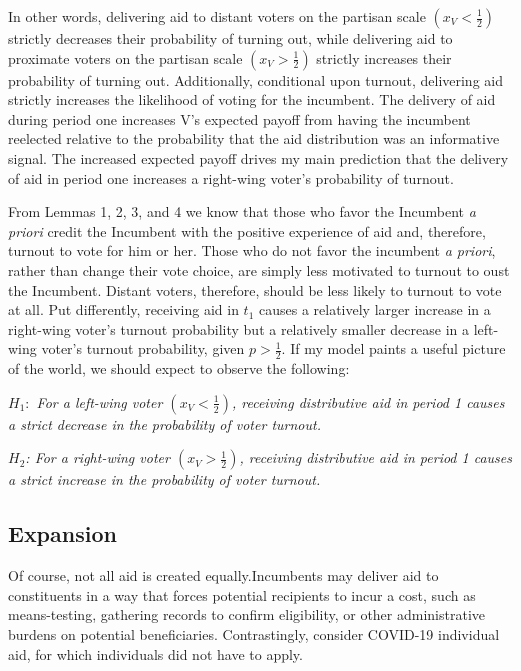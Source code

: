 \documentclass[12pt]{paper}
\begin{document}
In other words, delivering aid to distant voters on the partisan scale $(x_V < \frac{1}{2})$ strictly decreases their probability of turning out, while delivering aid to proximate voters on the partisan scale $(x_V > \frac{1}{2})$  strictly increases their probability of turning out. Additionally, conditional upon turnout, delivering aid strictly increases the likelihood of voting for the incumbent. The delivery of aid during period one increases V’s expected payoff from having the incumbent reelected relative to the probability that the aid distribution was an informative signal. The increased expected payoff drives my main prediction that the delivery of aid in period one increases a right-wing voter's probability of turnout.

From Lemmas 1, 2, 3, and 4 we know that those who favor the Incumbent \emph{a priori} credit the Incumbent with the positive experience of aid and, therefore, turnout to vote for him or her. Those who do not favor the incumbent \emph{a priori}, rather than change their vote choice, are simply less motivated to turnout to oust the Incumbent. Distant voters, therefore, should be less likely to turnout to vote at all. Put differently, receiving aid in $t_1$ causes a relatively larger increase in a right-wing voter’s turnout probability but a relatively smaller decrease in a left-wing voter’s turnout probability, given $p > \frac{1}{2}$. If my model paints a useful picture of the world, we should expect to observe the following:

\emph{$H_1:$ For a left-wing voter $(x_V < \frac{1}{2})$, receiving distributive aid in period 1 causes a strict decrease in the probability of voter turnout.}

\emph{$H_2$: For a right-wing voter $(x_V > \frac{1}{2})$, receiving distributive aid in period 1 causes a strict increase in the probability of voter turnout.}

\subsection{Expansion}
Of course, not all aid is created equally.Incumbents may deliver aid to constituents in a way that forces potential recipients to incur a cost, such as means-testing, gathering records to confirm eligibility, or other administrative burdens on potential beneficiaries. Contrastingly, consider COVID-19 individual aid, for which individuals did not have to apply.
\end{document}
